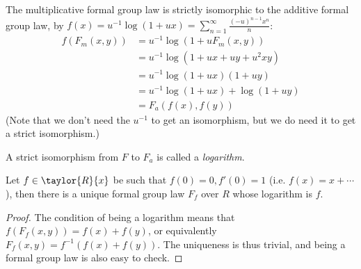 \begin{example*}
	The multiplicative formal group law is strictly isomorphic to the additive formal group law,
	by $f\left(x\right) = u^{-1} \log \left(1+ux\right) = \sum_{n=1}^{\infty} \frac{\left(-u\right)^{n-1} x^n}{n}$:
	\begin{align*}
		f\left(F_m\left(x,y\right)\right)
		&= u^{-1} \log \left(1+u F_m\left(x,y\right)\right)\\
		&= u^{-1} \log \left(1+ux+uy+u^2 xy\right)\\
		&= u^{-1} \log \left(1+ux\right)\left(1+uy\right)\\
		&= u^{-1} \log \left(1+ux\right) + \log \left(1+uy\right)\\
		&= F_a\left(f\left(x\right), f\left(y\right)\right)
	\end{align*}
	(Note that we don't need the $u^{-1}$ to get an isomorphism, but we do need it to get a strict isomorphism.)
\end{example*}

\begin{definition*}
	A strict isomorphism from $F$ to $F_a$ is called a \emph{logarithm}.
\end{definition*}

\begin{lemma*}
	Let $f \in \taylor{R}{x}$ be such that $f\left(0\right) = 0, f'\left(0\right) = 1$ (i.e. $f\left(x\right) = x + \cdots$),
	then there is a unique formal group law $F_f$ over $R$ whose logarithm is $f$.
\end{lemma*}

\begin{proof}
	The condition of being a logarithm means that $f\left(F_f\left(x,y\right)\right) = f\left(x\right) + f\left(y\right)$, or equivalently $F_f\left(x,y\right) = f^{-1}\left(f\left(x\right) + f\left(y\right)\right)$.
	The uniqueness is thus trivial, and being a formal group law is also easy to check.
\end{proof}
